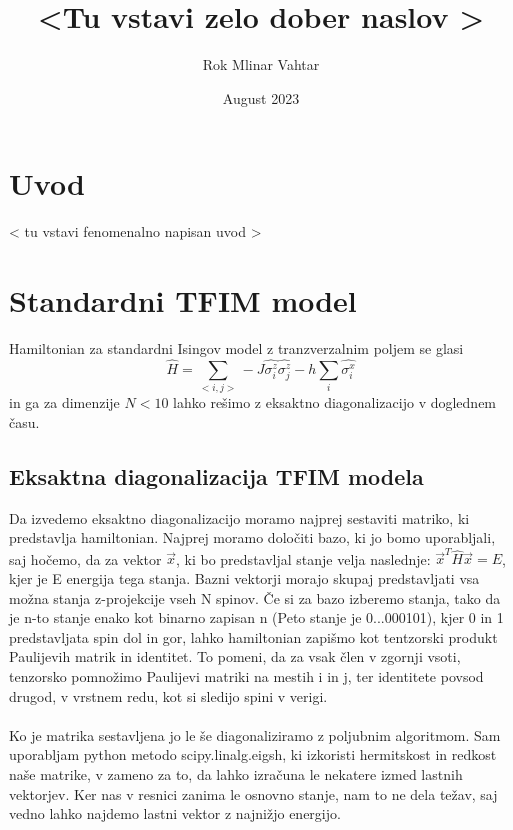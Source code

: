 \documentclass{article}
\title{\HUGE \textless Tu vstavi zelo dober naslov \textgreater}
\author{Rok Mlinar Vahtar}
\date{August 2023}
\begin{document}
\maketitle

\section{Uvod}
\textless \hspace{1pt} tu vstavi fenomenalno napisan uvod \textgreater


\section{Standardni TFIM model}
Hamiltonian za standardni Isingov model z tranzverzalnim poljem se glasi
\begin{equation}
    \hat{H} = \sum_{< i,j >} -J \hat{\sigma_i^z} \hat{\sigma_j^z} - h\sum_i \hat{\sigma_i^x}
\end{equation}
in ga za dimenzije $N < 10$ lahko rešimo z eksaktno diagonalizacijo v doglednem času. 

 \subsection{Eksaktna diagonalizacija TFIM modela}
Da izvedemo eksaktno diagonalizacijo moramo najprej sestaviti matriko, ki predstavlja hamiltonian. Najprej moramo določiti bazo, ki jo bomo uporabljali, saj hočemo, da za vektor $\Vec{x}$, ki bo predstavljal stanje velja naslednje: $\Vec{x}^T \hat{H} \Vec{x} = E$, kjer je E energija tega stanja. Bazni vektorji morajo skupaj predstavljati vsa možna stanja z-projekcije vseh N spinov. Če si za bazo izberemo stanja, tako da je n-to stanje enako kot binarno zapisan n (Peto stanje je 0...000101), kjer 0 in 1 predstavljata spin dol in gor, lahko hamiltonian zapišmo kot tentzorski produkt Paulijevih matrik in identitet. To pomeni, da za vsak člen v zgornji vsoti, tenzorsko pomnožimo Paulijevi matriki na mestih i in j, ter identitete povsod drugod, v vrstnem redu, kot si sledijo spini v verigi.\\\\
Ko je matrika sestavljena jo le še diagonaliziramo z poljubnim algoritmom. Sam uporabljam python metodo scipy.linalg.eigsh, ki izkoristi hermitskost in redkost naše matrike, v zameno za to, da lahko izračuna le nekatere izmed lastnih vektorjev. Ker nas v resnici zanima le osnovno stanje, nam to ne dela težav, saj vedno lahko najdemo lastni vektor z najnižjo energijo.\\\\\\
\end{document}
